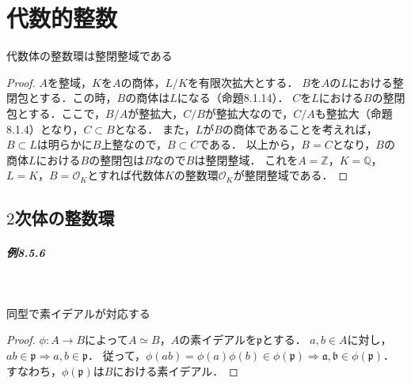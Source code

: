 \setcounter{chapter}{7}
\chapter{代数的整数}
\begin{screen}
  \begin{thm} \label{B_normal_ring}
    代数体の整数環は整閉整域である
  \end{thm}
\end{screen}
\begin{proof}
  $A$を整域，$K$を$A$の商体，$L/K$を有限次拡大とする．
  $B$を$A$の$L$における整閉包とする．この時，$B$の商体は$L$になる（命題8.1.14）．
  $C$を$L$における$B$の整閉包とする．ここで，$B/A$が整拡大，$C/B$が整拡大なので，$C/A$も整拡大（命題8.1.4）となり，$C \subset B$となる．
  また，$L$が$B$の商体であることを考えれば，$B \subset L$は明らかに$B$上整なので，$B \subset C$である．
  以上から，$B = C$となり，$B$の商体$L$における$B$の整閉包は$B$なので$B$は整閉整域．
  これを$A = \mathbb{Z}$，$K = \mathbb{Q}$，$L = K$，$B = \mathcal{O}_K$とすれば代数体$K$の整数環$ \mathcal{O}_K$が整閉整域である．
\end{proof}

\setcounter{section}{4}
\section{$2$次体の整数環}
\paragraph{例8.5.6}~
\begin{screen}
  同型で素イデアルが対応する
\end{screen}
\begin{proof}
  $ \phi:A \to B$によって$A \simeq B$，$A$の素イデアルを$ \mathfrak{p}$とする．
  $a, b \in A$に対し，$ab \in \mathfrak{p} \Rightarrow a, b \in \mathfrak{p}$．
  従って，$ \phi(ab) = \phi(a) \phi(b) \in \phi( \mathfrak{p}) \Rightarrow \mathfrak{a}, \mathfrak{b} \in \phi( \mathfrak{p})$．
  すなわち，$ \phi( \mathfrak{p})$は$B$における素イデアル．
\end{proof}

